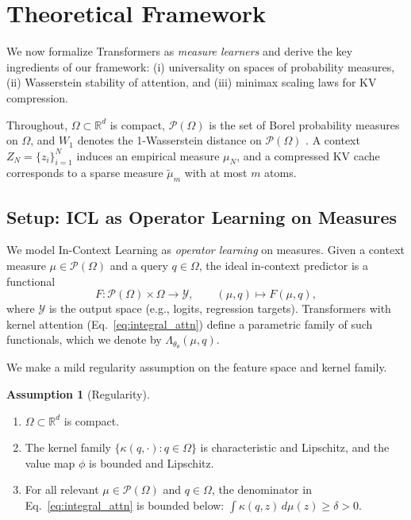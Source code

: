 \documentclass{article}
\theoremstyle{plain}
\theoremstyle{definition}
\newtheorem{assumption}[theorem]{Assumption}
\theoremstyle{remark}
\newcommand{\R}{\mathbb{R}}
\newcommand{\OmegaSpace}{\Omega} %
\newcommand{\Pspace}{\mathcal{P}(\OmegaSpace)} %
\newcommand{\muN}{\mu_N} %
\newcommand{\tmu}{\tilde{\mu}} %
\newcommand{\Wass}[1]{W_{#1}} %
\newcommand{\LambdaOp}{\Lambda_{\theta}} %
\newcommand{\valmap}{\phi}
\begin{document}
\section{Theoretical Framework}
\label{sec:theory}

We now formalize Transformers as \emph{measure learners} and derive the key ingredients of our framework:  
(i) universality on spaces of probability measures, (ii) Wasserstein stability of attention, and  
(iii) minimax scaling laws for KV compression.

Throughout, $\OmegaSpace \subset \R^d$ is compact, $\Pspace$ is the set of Borel probability measures on $\OmegaSpace$,  
and $\Wass{1}$ denotes the 1-Wasserstein distance on $\Pspace$ \citep{villani2009optimal}.  
A context $Z_N = \{z_i\}_{i=1}^N$ induces an empirical measure $\muN$, and a compressed KV cache corresponds to a sparse measure $\tmu_m$ with at most $m$ atoms.

\subsection{Setup: ICL as Operator Learning on Measures}
\label{sec:theory_setup}

We model In-Context Learning as \emph{operator learning} on measures.  
Given a context measure $\mu \in \Pspace$ and a query $q \in \OmegaSpace$, the ideal in-context predictor is a functional
\begin{equation}
    F: \Pspace \times \OmegaSpace \to \mathcal{Y}, 
    \qquad (\mu,q) \mapsto F(\mu,q),
\end{equation}
where $\mathcal{Y}$ is the output space (e.g., logits, regression targets).  
Transformers with kernel attention (Eq.~\eqref{eq:integral_attn}) define a parametric family of such functionals, which we denote by $\LambdaOp_\theta(\mu,q)$.

We make a mild regularity assumption on the feature space and kernel family.

\begin{assumption}[Regularity]
\label{ass:regularity}
\begin{enumerate}[leftmargin=*,nosep]
    \item $\OmegaSpace \subset \R^d$ is compact.
    \item The kernel family $\{\kappa(q,\cdot) : q \in \OmegaSpace\}$ is characteristic and Lipschitz, and the value map $\valmap$ is bounded and Lipschitz.
    \item For all relevant $\mu \in \Pspace$ and $q \in \OmegaSpace$, the denominator in Eq.~\eqref{eq:integral_attn} is bounded below: 
    $\int \kappa(q,z)\, d\mu(z) \ge \delta > 0$.
\end{enumerate}
\end{assumption}
\end{document}
